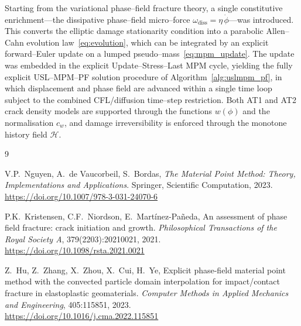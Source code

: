 \documentclass[12pt,a4paper]{article}
\newcommand{\eng}[1]{#1}
\begin{document}
	Starting from the variational phase--field fracture theory, a single
	constitutive enrichment---the dissipative phase--field micro--force
	$\omega_{\mathrm{diss}}=\eta\,\dot\phi$---was introduced. This converts the
	elliptic damage stationarity condition into a parabolic Allen--Cahn evolution
	law~\eqref{eq:evolution}, which can be integrated by an explicit forward--Euler
	update on a lumped pseudo--mass~\eqref{eq:mpm_update}. The update was embedded in
	the explicit Update--Stress--Last MPM cycle, yielding the fully explicit
	\eng{USL--MPM--PF} solution procedure of Algorithm~\ref{alg:uslmpm_pf}, in which
	displacement and phase field are advanced within a single time loop subject to
	the combined CFL/diffusion time--step restriction. Both AT1 and AT2 crack
	density models are supported through the functions $w(\phi)$ and the
	normalisation $c_w$, and damage irreversibility is enforced through the
	monotone history field $\mathcal{H}$.



	\begin{thebibliography}{9}

	V.P.\ Nguyen, A.\ de Vaucorbeil, S.\ Bordas,
	\textit{The Material Point Method: Theory, Implementations and Applications}.
	Springer, Scientific Computation, 2023.\\
	\href{https://doi.org/10.1007/978-3-031-24070-6}{https://doi.org/10.1007/978-3-031-24070-6}

	P.K.\ Kristensen, C.F.\ Niordson, E.\ Mart\'inez-Pa\~neda,
	An assessment of phase field fracture: crack initiation and growth.
	\textit{Philosophical Transactions of the Royal Society A}, 379(2203):20210021, 2021.\\
	\href{https://doi.org/10.1098/rsta.2021.0021}{https://doi.org/10.1098/rsta.2021.0021}

	Z.\ Hu, Z.\ Zhang, X.\ Zhou, X.\ Cui, H.\ Ye,
	Explicit phase-field material point method with the convected particle domain interpolation for impact/contact fracture in elastoplastic geomaterials.
	\textit{Computer Methods in Applied Mechanics and Engineering}, 405:115851, 2023.\\
	\href{https://doi.org/10.1016/j.cma.2022.115851}{https://doi.org/10.1016/j.cma.2022.115851}

	\end{thebibliography}
\end{document}
